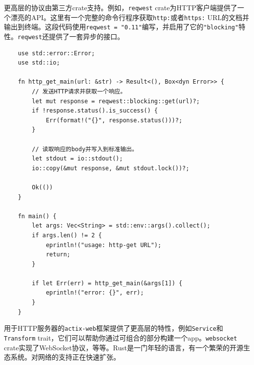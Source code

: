 更高层的协议由第三方crate支持。例如，\texttt{reqwest} crate为HTTP客户端提供了一个漂亮的API。这里有一个完整的命令行程序获取\texttt{http:}或者\texttt{https:} URL的文档并输出到终端。这段代码使用\texttt{reqwest = "0.11"}编写，并启用了它的\texttt{"blocking"}特性。\texttt{reqwest}还提供了一套异步的接口。
\begin{verbatim}
    use std::error::Error;
    use std::io;

    fn http_get_main(url: &str) -> Result<(), Box<dyn Error>> {
        // 发送HTTP请求并获取一个响应。
        let mut response = reqwest::blocking::get(url)?;
        if !response.status().is_success() {
            Err(format!("{}", response.status()))?;
        }

        // 读取响应的body并写入到标准输出。
        let stdout = io::stdout();
        io::copy(&mut response, &mut stdout.lock())?;

        Ok(())
    }

    fn main() {
        let args: Vec<String> = std::env::args().collect();
        if args.len() != 2 {
            eprintln!("usage: http-get URL");
            return;
        }

        if let Err(err) = http_get_main(&args[1]) {
            eprintln!("error: {}", err);
        }
    }
\end{verbatim}

用于HTTP服务器的\texttt{actix-web}框架提供了更高层的特性，例如\texttt{Service}和\texttt{Transform} trait，它们可以帮助你通过可组合的部分构建一个app。\texttt{websocket} crate实现了WebSocket协议，等等。Rust是一门年轻的语言，有一个繁荣的开源生态系统。对网络的支持正在快速扩张。
